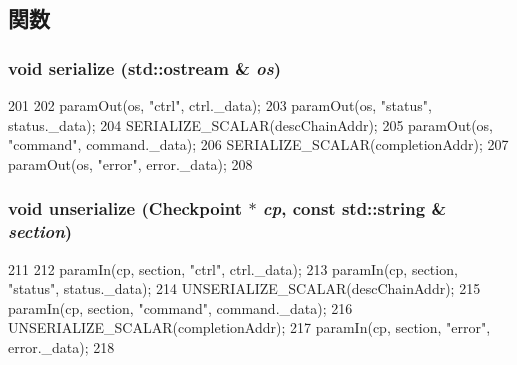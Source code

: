 \subsection{関数}
\hypertarget{structCopyEngineReg_1_1ChanRegs_a53e036786d17361be4c7320d39c99b84}{
\subsubsection[{serialize}]{\setlength{\rightskip}{0pt plus 5cm}void serialize (std::ostream \& {\em os})}}
\label{structCopyEngineReg_1_1ChanRegs_a53e036786d17361be4c7320d39c99b84}



\begin{DoxyCode}
201     {
202         paramOut(os, "ctrl", ctrl._data);
203         paramOut(os, "status", status._data);
204         SERIALIZE_SCALAR(descChainAddr);
205         paramOut(os, "command", command._data);
206         SERIALIZE_SCALAR(completionAddr);
207         paramOut(os, "error", error._data);
208     }
\end{DoxyCode}
\hypertarget{structCopyEngineReg_1_1ChanRegs_af22e5d6d660b97db37003ac61ac4ee49}{
\subsubsection[{unserialize}]{\setlength{\rightskip}{0pt plus 5cm}void unserialize ({\bf Checkpoint} $\ast$ {\em cp}, \/  const std::string \& {\em section})}}
\label{structCopyEngineReg_1_1ChanRegs_af22e5d6d660b97db37003ac61ac4ee49}



\begin{DoxyCode}
211     {
212         paramIn(cp, section, "ctrl", ctrl._data);
213         paramIn(cp, section, "status", status._data);
214         UNSERIALIZE_SCALAR(descChainAddr);
215         paramIn(cp, section, "command", command._data);
216         UNSERIALIZE_SCALAR(completionAddr);
217         paramIn(cp, section, "error", error._data);
218     }
\end{DoxyCode}


